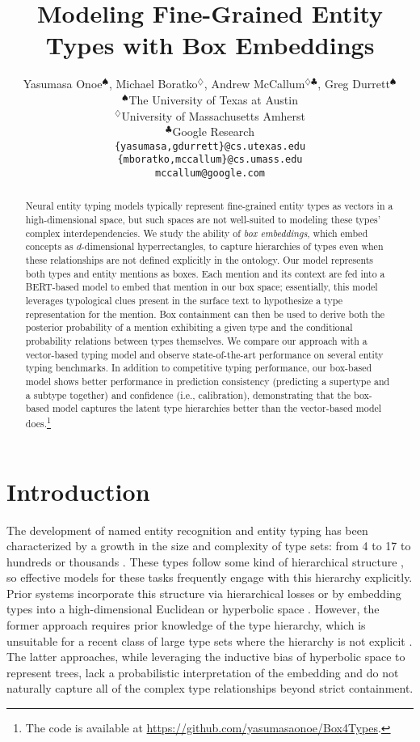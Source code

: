\documentclass[11pt,a4paper]{article}
\title{Modeling Fine-Grained Entity Types with Box Embeddings}
\author{
Yasumasa Onoe$^\spadesuit$,
Michael Boratko$^\diamondsuit$,
Andrew McCallum$^{\diamondsuit \clubsuit}$,
Greg Durrett$^\spadesuit$\\
$^\spadesuit$The University of Texas at Austin \\
$^\diamondsuit$University of Massachusetts Amherst \\
$^\clubsuit$Google Research\\
{\tt\{yasumasa,gdurrett\}@cs.utexas.edu} \\{\tt \{mboratko,mccallum\}@cs.umass.edu} \\{\tt mccallum@google.com}}
\date{}
\begin{document}
\setlength{\abovedisplayskip}{2pt}
\setlength{\belowdisplayskip}{2pt}

\maketitle
\begin{abstract}
Neural entity typing models typically represent fine-grained entity types as vectors in a high-dimensional space, but such spaces are not well-suited to modeling these types' complex interdependencies. We study the ability of \emph{box embeddings}, which embed concepts as $d$-dimensional hyperrectangles, to capture hierarchies of types even when these relationships are not defined explicitly in the ontology. Our model represents both types and entity mentions as boxes. Each mention and its context are fed into a BERT-based model to embed that mention in our box space; essentially, this model leverages typological clues present in the surface text to hypothesize a type representation for the mention. Box containment can then be used to derive both the posterior probability of a mention exhibiting a given type and the conditional probability relations between types themselves. We compare our approach with a vector-based typing model and observe state-of-the-art performance on several entity typing benchmarks. In addition to competitive typing performance, our box-based model shows better performance in prediction consistency (predicting a supertype and a subtype together) and confidence (i.e., calibration), demonstrating that the box-based model captures the latent type hierarchies better than the vector-based model does.\footnote{The code is available at \url{https://github.com/yasumasaonoe/Box4Types}.} 
\end{abstract}

\section{Introduction}\label{sec:intro}
The development of named entity recognition and entity typing has been characterized by a growth in the size and complexity of type sets: from 4 \citep{conll_03} to 17 \citep{Eduard_Hovy_06} to hundreds \cite{bbn, Xiao_Ling_12} or thousands \cite{Eunsol_Choi_18}. These types follow some kind of hierarchical structure \citep{bbn, Xiao_Ling_12, Dan_Gillick_14, Shikhar_Murty_18}, so effective models for these tasks frequently engage with this hierarchy explicitly. Prior systems incorporate this structure via hierarchical losses \cite{Shikhar_Murty_18, Peng_Xu_18, Tongfei_Chen_20} or by embedding types into a high-dimensional Euclidean or hyperbolic space \citep{Dani_Yogatama_15,  Federico_Lopez_20}. However, the former approach requires prior knowledge of the type hierarchy, which is unsuitable for a recent class of large type sets where the hierarchy is not explicit \cite{Eunsol_Choi_18,Yasumasa_Onoe_20}. The latter approaches, while leveraging the inductive bias of hyperbolic space to represent trees, lack a probabilistic interpretation of the embedding and do not naturally capture all of the complex type relationships beyond strict containment. 
\end{document}
